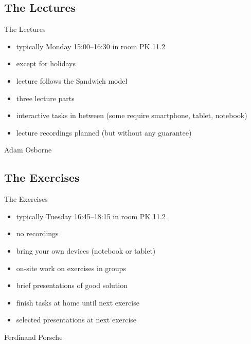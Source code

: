 
\subsection{The Lectures}
\begin{frame}{\insertsubsection}
	\begin{fancycolumns}[widths={60}]
		\begin{definition}{The Lectures}
			\begin{itemize}
				\item typically Monday 15:00--16:30 in room PK 11.2
				\item except for holidays 
				\item lecture follows the Sandwich model
				\item three lecture parts
				\item interactive tasks in between (some require smartphone, tablet, notebook)
				\item lecture recordings planned (but without any guarantee)
			\end{itemize}
		\end{definition}
	\nextcolumn
		\begin{note}{Adam Osborne} %
		\end{note}
	\end{fancycolumns}
\end{frame}

\subsection{The Exercises}
\begin{frame}{\insertsubsection}
	\begin{fancycolumns}[widths={55}]
		\begin{definition}{The Exercises}
			\begin{itemize}
				\item typically Tuesday 16:45--18:15 in room PK 11.2
				\item no recordings
				\item bring your own devices (notebook or tablet)
				\item on-site work on exercises in groups
				\item brief presentations of good solution
				\item finish tasks at home until next exercise
				\item selected presentations at next exercise
			\end{itemize}
		\end{definition}
		\nextcolumn
		\begin{note}{Ferdinand Porsche}
		\end{note}
	\end{fancycolumns}
\end{frame}

